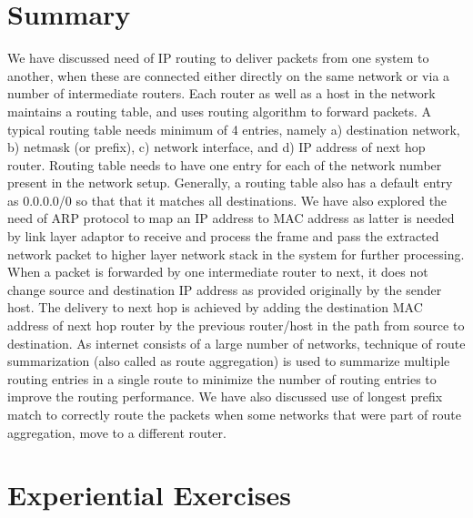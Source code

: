 \begin{multicols}{2}
\section{Summary}\label{chap2-sec8}

We have discussed need of IP routing to deliver packets from one system to another, when these are connected either directly on the same network or via a number of intermediate routers. Each router as well as a host in the network maintains a routing table, and uses routing algorithm to forward packets.  A typical routing table needs minimum of 4 entries, namely a) destination network, b) netmask (or prefix), c) network interface, and d) IP address of next hop router. Routing table needs to have one entry for each of the network number present in the network setup. Generally, a routing table also has a default entry as 0.0.0.0/0 so that that it matches all destinations. We have also explored the need of ARP protocol to map an IP address to MAC address as latter is needed by link layer adaptor to receive and process the frame and pass the extracted network packet to higher layer network stack in the system for further processing. When a packet is forwarded by one intermediate router to next, it does not change source and destination IP address as provided originally by the sender host. The delivery to next hop is achieved by adding the destination MAC address of next hop router by the previous router/host in the path from source to destination. As internet consists of a large number of networks, technique of route summarization (also called as route aggregation) is used to summarize multiple routing entries in a single route to minimize the number of routing entries to improve the routing performance. We have also discussed use of longest prefix match to correctly route the packets when some networks that were part of route aggregation, move to a different router.

\section{Experiential Exercises}\label{chap2-sec9}


\end{multicols}
